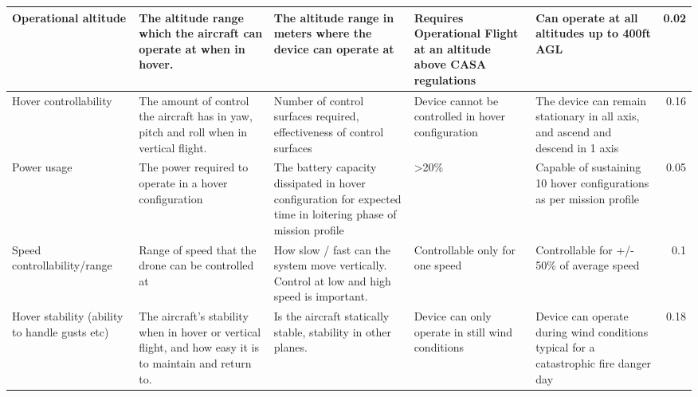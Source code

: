 \begin{table}[H]
{\begin{tabular}{|p{2cm}|p{4cm}|p{4cm}|p{4cm}|p{4cm}|r|}
Operational altitude                          & The altitude range which the aircraft can operate at when in hover.                                      & The altitude range in meters where the device can operate at                                                                                                & Requires Operational Flight at an altitude above CASA regulations   & Can operate at all altitudes up to 400ft AGL                                                                            & 0.02      \\ \hline
Hover controllability                         & The amount of control the aircraft has in yaw, pitch and roll when in vertical flight.                   & Number of control surfaces required, effectiveness of control surfaces                                                                                      & Device cannot be controlled in hover configuration                  & The device can remain stationary in all axis, and ascend and descend in 1 axis                                          & 0.16      \\ \hline
Power usage                                   & The power required to operate in a hover configuration                                                   & The battery capacity dissipated in hover configuration for expected time in loitering phase of mission profile & \textgreater{}20\%                                                  & Capable of sustaining 10 hover configurations as per mission profile                                                    & 0.05      \\ \hline
Speed controllability/range                   & Range of speed that the drone can be controlled at                                                       & How slow / fast can the system move vertically. Control at low and high speed is important.                                                                 & Controllable only for one speed                                     & Controllable for +/- 50\% of average speed                                                                              & 0.1       \\ \hline
Hover stability (ability to handle gusts etc) & The aircraft's stability when in hover or vertical flight, and how easy it is to maintain and return to. & Is the aircraft statically stable, stability in other planes.                                                                                               & Device can only operate in still wind conditions                    & Device can operate during wind conditions typical for a catastrophic fire danger day                                    & 0.18      \\ \hline

\end{tabular}}
\end{table}
